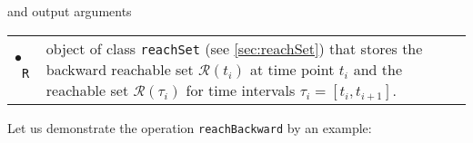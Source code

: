 and output arguments

\begin{center}
\renewcommand{\arraystretch}{1.3}
\begin{tabular}[t]{l p{13cm} }
	$\bullet$~\texttt{R} & object of class \texttt{reachSet} (see \cref{sec:reachSet}) that stores the backward reachable set $\mathcal{R}(t_i)$ at time point $t_i$ and the reachable set $\mathcal{R}(\tau_i)$ for time intervals $\tau_i = [t_i,t_{i+1}]$.
\end{tabular}
\end{center}

Let us demonstrate the operation \texttt{reachBackward} by an example:

\begin{center}
\begin{minipage}[t]{0.58\textwidth}
	\footnotesize
	
\end{minipage}
\end{center}
